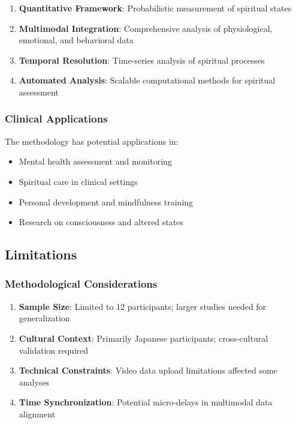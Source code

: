 \documentclass[12pt,a4paper]{article}
\begin{document}
\begin{enumerate}
    \item \textbf{Quantitative Framework}: Probabilistic measurement of spiritual states
    \item \textbf{Multimodal Integration}: Comprehensive analysis of physiological, emotional, and behavioral data
    \item \textbf{Temporal Resolution}: Time-series analysis of spiritual processes
    \item \textbf{Automated Analysis}: Scalable computational methods for spiritual assessment
\end{enumerate}

\subsubsection{Clinical Applications}

The methodology has potential applications in:

\begin{itemize}
    \item Mental health assessment and monitoring
    \item Spiritual care in clinical settings
    \item Personal development and mindfulness training
    \item Research on consciousness and altered states
\end{itemize}

\subsection{Limitations}

\subsubsection{Methodological Considerations}

\begin{enumerate}
    \item \textbf{Sample Size}: Limited to 12 participants; larger studies needed for generalization
    \item \textbf{Cultural Context}: Primarily Japanese participants; cross-cultural validation required
    \item \textbf{Technical Constraints}: Video data upload limitations affected some analyses
    \item \textbf{Time Synchronization}: Potential micro-delays in multimodal data alignment
\end{enumerate}
\end{document}
